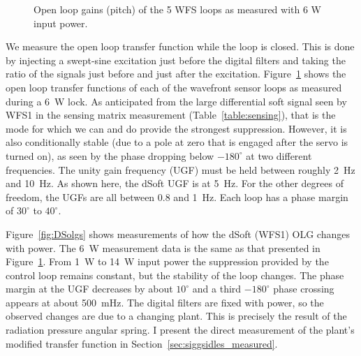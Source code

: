 \begin{figure}
\begin{centering}
\caption{Open loop gains (pitch) of the 5 WFS loops as measured with 6 W
  input power.}
\label{fig:olgs6W}
\end{centering}
\end{figure}

We measure the open loop transfer function while the loop is
closed. This is done by injecting a swept-sine excitation just before
the digital filters and taking the ratio of the signals just before
and just after the excitation. Figure~\ref{fig:olgs6W} shows the open
loop transfer functions of each of the wavefront sensor loops as
measured during a 6~W lock. As anticipated from the large differential
soft signal seen by WFS1 in the sensing matrix measurement
(Table~\ref{table:sensing}), that is the mode for which we can and do
provide the strongest suppression. However, it is also conditionally
stable (due to a pole at zero that is engaged after the servo is
turned on), as seen by the phase dropping below $-180^{\circ}$ at two
different frequencies. The unity gain frequency (UGF) must be held
between roughly 2~Hz and 10~Hz. As shown here, the dSoft UGF is at
5~Hz. For the other degrees of freedom, the UGFs are all between 0.8
and 1~Hz. Each loop has a phase margin of $30^{\circ}$ to
$40^{\circ}$.

Figure~\ref{fig:DSolgs} shows measurements of how the dSoft (WFS1) OLG
changes with power. The 6~W measurement data is the same as that
presented in Figure~\ref{fig:olgs6W}. From 1~W to 14~W input power the
suppression provided by the control loop remains constant, but the
stability of the loop changes. The phase margin at the UGF decreases
by about $10^{\circ}$ and a third $-180^{\circ}$ phase crossing
appears at about 500~mHz. The digital filters are fixed with power, so
the observed changes are due to a changing plant. This is precisely
the result of the radiation pressure angular spring. I present the
direct measurement of the plant's modified transfer function in
Section~\ref{sec:siggsidles_measured}.

